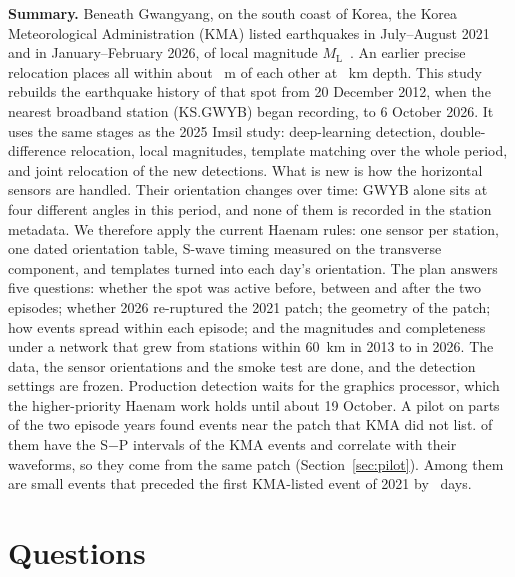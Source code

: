 \documentclass[11pt,a4paper]{article}
\newcommand{\ML}{\ensuremath{M_\mathrm{L}}}
\begin{document}
\vspace{2pt}
\noindent\begin{minipage}{\textwidth}
\small
\textbf{\sffamily Summary.}
Beneath Gwangyang, on the south coast of Korea, the Korea Meteorological Administration (KMA) listed  earthquakes in July--August 2021 and  in January--February 2026, of local magnitude \ML\ . An earlier precise relocation places all  within about ~m of each other at ~km depth.
This study rebuilds the earthquake history of that spot from 20 December 2012, when the nearest broadband station (KS.GWYB) began recording, to 6 October 2026. It uses the same stages as the 2025 Imsil study: deep-learning detection, double-difference relocation, local magnitudes, template matching over the whole period, and joint relocation of the new detections.
What is new is how the horizontal sensors are handled. Their orientation changes over time: GWYB alone sits at four different angles in this period, and none of them is recorded in the station metadata. We therefore apply the current Haenam rules: one sensor per station, one dated orientation table, S-wave timing measured on the transverse component, and templates turned into each day's orientation.
The plan answers five questions: whether the spot was active before, between and after the two episodes; whether 2026 re-ruptured the 2021 patch; the geometry of the patch; how events spread within each episode; and the magnitudes and completeness under a network that grew from  stations within 60~km in 2013 to  in 2026.
The data, the sensor orientations and the smoke test are done, and the detection settings are frozen. Production detection waits for the graphics processor, which the higher-priority Haenam work holds until about 19 October.
A pilot on parts of the two episode years found  events near the patch that KMA did not list.  of them have the S$-$P intervals of the KMA events and correlate with their waveforms, so they come from the same patch (Section~\ref{sec:pilot}). Among them are  small events that preceded the first KMA-listed event of 2021 by ~days.
\end{minipage}
\vspace{4pt}

\section{Questions}
\end{document}
